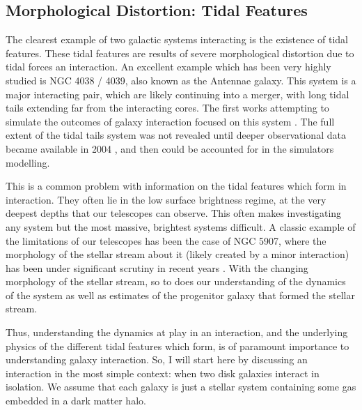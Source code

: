 \subsection{Morphological Distortion: Tidal Features}
\noindent The clearest example of two galactic systems interacting is the existence of tidal features. These tidal features are results of severe morphological distortion due to tidal forces an interaction. An excellent example which has been very highly studied is NGC 4038 / 4039, also known as the Antennae galaxy. This system is a major interacting pair, which are likely continuing into a merger, with long tidal tails extending far from the interacting cores. The first works attempting to simulate the outcomes of galaxy interaction focused on this system \citep{Works like TandT which looked at this}. The full extent of the tidal tails system was not revealed until deeper observational data became available in 2004 \citep{Citation from BandM}, and then could be accounted for in the simulators modelling.

This is a common problem with information on the tidal features which form in interaction. They often lie in the low surface brightness regime, at the very deepest depths that our telescopes can observe. This often makes investigating any system but the most massive, brightest systems difficult. A classic example of the limitations of our telescopes has been the case of NGC 5907, where the morphology of the stellar stream about it (likely created by a minor interaction) has been under significant scrutiny in recent years \citep{If this paragraph remains here, cite the different NGC 5907 papers}. With the changing morphology of the stellar stream, so to does our understanding of the dynamics of the system as well as estimates of the progenitor galaxy that formed the stellar stream. 

Thus, understanding the dynamics at play in an interaction, and the underlying physics of the different tidal features which form, is of paramount importance to understanding galaxy interaction. So, I will start here by discussing an interaction in the most simple context: when two disk galaxies interact in isolation. We assume that each galaxy is just a stellar system containing some gas embedded in a dark matter halo.

